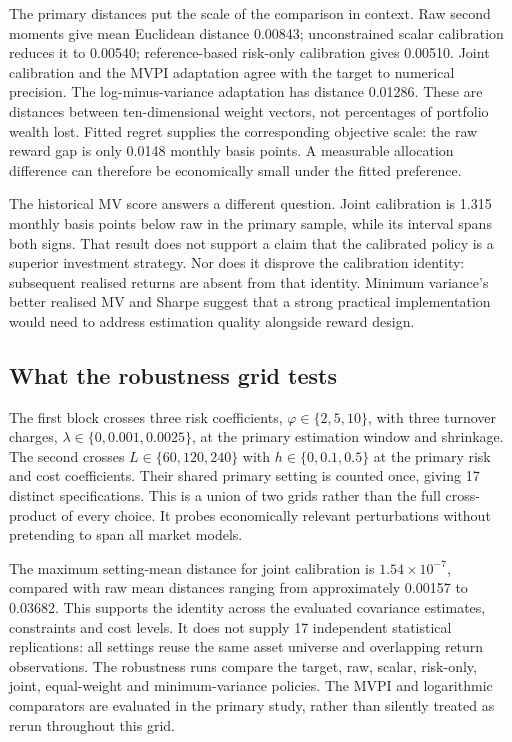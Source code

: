 \documentclass[sigconf,anonymous,review]{acmart}
\begin{document}
The primary distances put the scale of the comparison in context. Raw second moments give mean Euclidean distance 0.00843; unconstrained scalar calibration reduces it to 0.00540; reference-based risk-only calibration gives 0.00510. Joint calibration and the MVPI adaptation agree with the target to numerical precision. The log-minus-variance adaptation has distance 0.01286. These are distances between ten-dimensional weight vectors, not percentages of portfolio wealth lost. Fitted regret supplies the corresponding objective scale: the raw reward gap is only 0.0148 monthly basis points. A measurable allocation difference can therefore be economically small under the fitted preference.

The historical MV score answers a different question. Joint calibration is 1.315 monthly basis points below raw in the primary sample, while its interval spans both signs. That result does not support a claim that the calibrated policy is a superior investment strategy. Nor does it disprove the calibration identity: subsequent realised returns are absent from that identity. Minimum variance's better realised MV and Sharpe suggest that a strong practical implementation would need to address estimation quality alongside reward design.

\subsection{What the robustness grid tests}
The first block crosses three risk coefficients, $\varphi\in\{2,5,10\}$, with three turnover charges, $\lambda\in\{0,0.001,0.0025\}$, at the primary estimation window and shrinkage. The second crosses $L\in\{60,120,240\}$ with $h\in\{0,0.1,0.5\}$ at the primary risk and cost coefficients. Their shared primary setting is counted once, giving 17 distinct specifications. This is a union of two grids rather than the full cross-product of every choice. It probes economically relevant perturbations without pretending to span all market models.

The maximum setting-mean distance for joint calibration is $1.54\times10^{-7}$, compared with raw mean distances ranging from approximately 0.00157 to 0.03682. This supports the identity across the evaluated covariance estimates, constraints and cost levels. It does not supply 17 independent statistical replications: all settings reuse the same asset universe and overlapping return observations. The robustness runs compare the target, raw, scalar, risk-only, joint, equal-weight and minimum-variance policies. The MVPI and logarithmic comparators are evaluated in the primary study, rather than silently treated as rerun throughout this grid.
\end{document}
